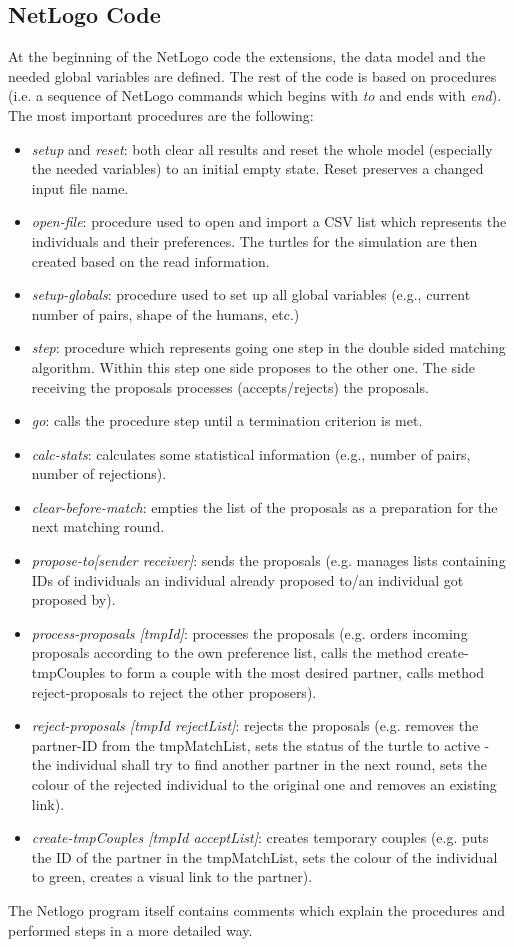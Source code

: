 \subsection{NetLogo Code}
At the beginning of the NetLogo code the extensions, the data model and the needed global variables are defined.
The rest of the code is based on procedures (i.e. a sequence of NetLogo commands which begins with \textit{to} and ends with \textit{end}).
The most important procedures are the following:
\begin{itemize}
	\item \textit{setup} and \textit{reset}: both clear all results and reset the whole model (especially the needed variables) to an initial empty state. 
Reset preserves a changed input file name.
	\item \textit{open-file}: procedure used to open and import a CSV list which represents the individuals and their preferences. The turtles for the simulation are then created based on the read information.
	\item \textit{setup-globals}: procedure used to set up all global variables (e.g., current number of pairs, shape of the humans, etc.)
	\item \textit{step}: procedure which represents going one step in the double sided matching algorithm. Within this step one side proposes to the other one. The side receiving the proposals processes (accepts/rejects) the proposals.
	\item \textit{go}: calls the procedure step until a termination criterion is met.
	\item \textit{calc-stats}: calculates some statistical information (e.g., number of pairs, number of rejections).
	\item \textit{clear-before-match}: empties the list of the proposals as a preparation for the next matching round.
	\item \textit{propose-to[sender receiver]}: sends the proposals (e.g. manages lists containing IDs of individuals an individual already proposed to/an individual got proposed by).
	\item \textit{process-proposals [tmpId]}: processes the proposals (e.g. orders incoming proposals according to the own preference list, calls the method create-tmpCouples to form a couple with the most desired partner, calls method reject-proposals to reject the other proposers).
	\item \textit{reject-proposals [tmpId rejectList]}: rejects the proposals (e.g. removes the partner-ID from the tmpMatchList, sets the status of the turtle to active - the individual shall try to find another partner in the next round, sets the colour of the rejected individual to the original one and removes an existing link).
	\item \textit{create-tmpCouples [tmpId acceptList]}: creates temporary couples (e.g. puts the ID of the partner in the tmpMatchList, sets the colour of the individual to green, creates a visual link to the partner).
\end{itemize}
The Netlogo program itself contains comments which explain the procedures and performed steps in a more detailed way.

